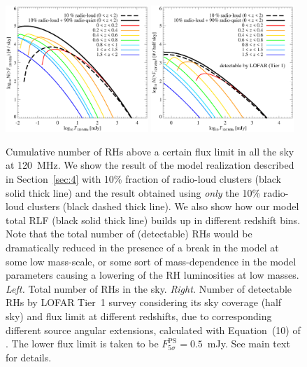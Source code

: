 \documentclass[traditabstract]{aa}
\newcommand{\rmn}{\mathrm}
\begin{document}
\begin{figure}[t]
\centering
\includegraphics[width=0.48\textwidth]{figures/RLF_LOFAR_flux.eps}
\includegraphics[width=0.48\textwidth]{figures/RLF_LOFAR_flux_detectable.eps}
\caption{Cumulative number of RHs above a certain flux limit in all the sky at 120~MHz. We show the result of the model realization described in Section~\ref{sec:4} with 10\% fraction of radio-loud clusters (black solid thick line) and the result obtained using \emph{only} the 10\% radio-loud clusters (black dashed thick line). We also show how our model total RLF (black solid thick line) builds up in different redshift bins. Note that the total number of (detectable) RHs would be dramatically reduced in the presence of a break in the model at some low mass-scale, or some sort of mass-dependence in the model parameters causing a lowering of the RH luminosities at low masses.
\emph{Left.} Total number of RHs in the sky. 
\emph{Right.} Number of detectable RHs by LOFAR Tier~1 survey considering its sky coverage (half sky) and flux limit at different redshifts, due to corresponding different source angular extensions, calculated with Equation~(10) of \cite{2010A&A...509A..68C}. The lower flux limit is taken to be $F_{5\sigma}^{\rmn{PS}}=0.5$~mJy.
See main text for details.
}
\label{fig:RLF_120_flux}
\end{figure}
\end{document}

